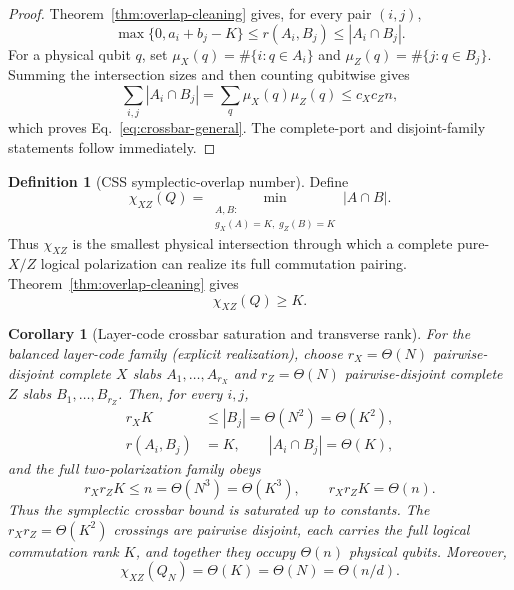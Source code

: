 \documentclass[aps,prx,reprint,superscriptaddress,nofootinbib,floatfix,longbibliography]{revtex4-2}
\newtheorem{corollary}[theorem]{Corollary}
\theoremstyle{definition}
\newtheorem{definition}[theorem]{Definition}
\begin{document}
\begin{proof}
Theorem~\ref{thm:overlap-cleaning} gives, for every pair $(i,j)$,
\begin{equation*}
 \max\{0,a_i+b_j-K\}\le r(A_i,B_j)\le |A_i\cap B_j|.
\end{equation*}
For a physical qubit $q$, set
$\mu_X(q)=\#\{i:q\in A_i\}$ and $\mu_Z(q)=\#\{j:q\in B_j\}$.  Summing the
intersection sizes and then counting qubitwise gives
\begin{equation*}
 \sum_{i,j}|A_i\cap B_j|
 =\sum_q \mu_X(q)\mu_Z(q)
 \le c_Xc_Zn,
\end{equation*}
which proves Eq.~\eqref{eq:crossbar-general}.  The complete-port and
disjoint-family statements follow immediately.
\end{proof}

\begin{definition}[CSS symplectic-overlap number]
\label{def:chi-xz}
Define
\begin{equation}
 \chi_{XZ}(Q)=\min_{\substack{A,B:\\ g_X(A)=K,\;g_Z(B)=K}}|A\cap B|.
 \label{eq:chi-xz}
\end{equation}
Thus $\chi_{XZ}$ is the smallest physical intersection through which a complete pure-$X/Z$ logical polarization can realize its full commutation pairing.  Theorem~\ref{thm:overlap-cleaning} gives
\begin{equation}
 \chi_{XZ}(Q)\ge K.
 \label{eq:chi-lower}
\end{equation}
\end{definition}

\begin{corollary}[Layer-code crossbar saturation and transverse rank]
\label{cor:layer-port-packing}
For the balanced layer-code family (explicit realization), choose
$r_X=\Theta(N)$ pairwise-disjoint complete $X$ slabs
$A_1,\ldots,A_{r_X}$ and $r_Z=\Theta(N)$ pairwise-disjoint complete $Z$ slabs
$B_1,\ldots,B_{r_Z}$.  Then, for every $i,j$,
\begin{align}
 r_XK&\le |B_j|=\Theta(N^2)=\Theta(K^2),
 \label{eq:layer-port-pack}\\
 r(A_i,B_j)&=K,\qquad |A_i\cap B_j|=\Theta(K),
 \label{eq:layer-crossing-rank}
\end{align}
and the full two-polarization family obeys
\begin{equation}
 r_Xr_ZK\le n=\Theta(N^3)=\Theta(K^3),
 \qquad r_Xr_ZK=\Theta(n).
 \label{eq:layer-crossbar-saturation}
\end{equation}
Thus the symplectic crossbar bound is saturated up to constants.  The
$r_Xr_Z=\Theta(K^2)$ crossings are pairwise disjoint, each carries the full
logical commutation rank $K$, and together they occupy $\Theta(n)$ physical
qubits.  Moreover,
\begin{equation}
 \chi_{XZ}(Q_N)=\Theta(K)=\Theta(N)=\Theta(n/d).
 \label{eq:layer-chi}
\end{equation}
\end{corollary}
\end{document}

